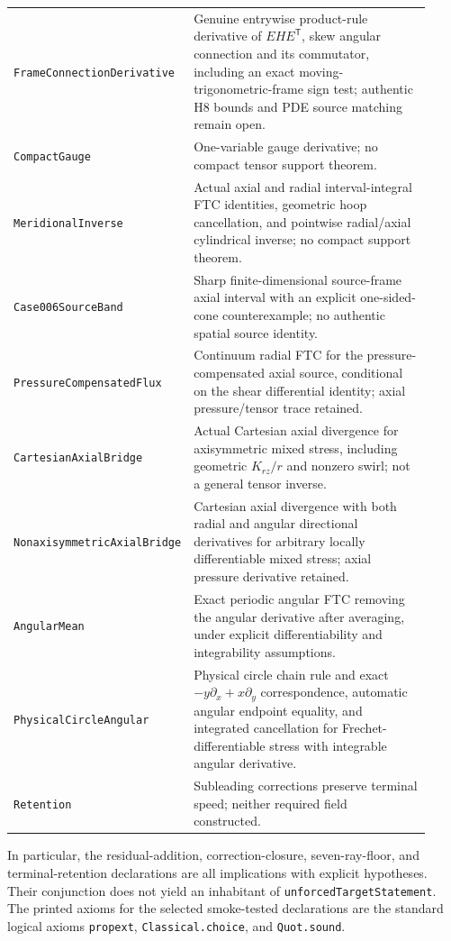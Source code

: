 \documentclass[11pt,a4paper]{article}
\theoremstyle{plain}
\theoremstyle{definition}
\begin{document}
\begin{longtable}{@{}>{\raggedright\arraybackslash}p{0.31\linewidth}>{\raggedright\arraybackslash}p{0.61\linewidth}@{}}
\texttt{FrameConnectionDerivative} & Genuine entrywise product-rule derivative of $EHE^{\mathsf T}$, skew angular connection and its commutator, including an exact moving-trigonometric-frame sign test; authentic H8 bounds and PDE source matching remain open.\\
\texttt{CompactGauge} & One-variable gauge derivative; no compact tensor support theorem.\\
\texttt{MeridionalInverse} & Actual axial and radial interval-integral FTC identities, geometric hoop cancellation, and pointwise radial/axial cylindrical inverse; no compact support theorem.\\
\texttt{Case006SourceBand} & Sharp finite-dimensional source-frame axial interval with an explicit one-sided-cone counterexample; no authentic spatial source identity.\\
\texttt{PressureCompensatedFlux} & Continuum radial FTC for the pressure-compensated axial source, conditional on the shear differential identity; axial pressure/tensor trace retained.\\
\texttt{CartesianAxialBridge} & Actual Cartesian axial divergence for axisymmetric mixed stress, including geometric $K_{rz}/r$ and nonzero swirl; not a general tensor inverse.\\
\texttt{NonaxisymmetricAxialBridge} & Cartesian axial divergence with both radial and angular directional derivatives for arbitrary locally differentiable mixed stress; axial pressure derivative retained.\\
\texttt{AngularMean} & Exact periodic angular FTC removing the angular derivative after averaging, under explicit differentiability and integrability assumptions.\\
\texttt{PhysicalCircleAngular} & Physical circle chain rule and exact $-y\partial_x+x\partial_y$ correspondence, automatic angular endpoint equality, and integrated cancellation for Frechet-differentiable stress with integrable angular derivative.\\
\texttt{Retention} & Subleading corrections preserve terminal speed; neither required field constructed.\\
\bottomrule
\end{longtable}
\endgroup
In particular, the residual-addition, correction-closure,
seven-ray-floor, and terminal-retention declarations are all
implications with explicit hypotheses. Their conjunction does not
yield an inhabitant of
\texttt{unforcedTargetStatement}. The printed axioms for the selected
smoke-tested declarations are the standard logical axioms
\texttt{propext}, \texttt{Classical.choice}, and \texttt{Quot.sound}.
\end{document}
